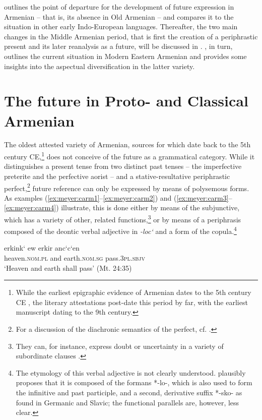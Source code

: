 \documentclass[output=paper,colorlinks,citecolor=brown]{langscibook}
\begin{document}
	 outlines the point of departure for the development of future expression in Armenian – that is, its absence in Old Armenian – and compares it to the situation in other early Indo-European languages. Thereafter, the two main changes in the Middle Armenian period, that is first the creation of a periphrastic present and its later reanalysis as a future, will be discussed in . , in turn, outlines the current situation in Modern Eastern Armenian and provides some insights into the aspectual diversification in the latter variety.
	
	
	\section{The future in Proto- and Classical Armenian}\label{sec:meyer:carm}
	The oldest attested variety of Armenian, sources for which date back to the 5th century CE,\footnote{While the earliest epigraphic evidence of Armenian dates to the 5th century CE \citep{Stone19901}, the literary attestations post-date this period by far, with the earliest manuscript dating to the 9th century.} does not conceive of the future as a grammatical category. While it distinguishes a present tense from two distinct past tenses – the imperfective preterite and the perfective aorist – and a stative-resultative periphrastic perfect,\footnote{For a discussion of the diachronic semantics of the perfect, cf. \citet{Meyer2024a}.} future reference can only be expressed by means of polysemous forms. As examples (\ref{ex:meyer:carm1}–\ref{ex:meyer:carm2}) and (\ref{ex:meyer:carm3}–\ref{ex:meyer:carm4}) illustrate, this is done either by means of the subjunctive, which has a variety of other, related functions,\footnote{They can, for instance, express doubt or uncertainty in a variety of subordinate clauses \citep[200, 205--207]{Jensen1959}.} or by means of a periphrasis composed of the deontic verbal adjective in \textit{-loc‘} and a form of the copula.\footnote{The etymology of this verbal adjective is not clearly understood. \citet[129]{Godel1975} plausibly proposes that it is composed of the formans *-lo-, which is also used to form the infinitive and past participle, and a second, derivative suffix *-sko- as found in Germanic and Slavic; the functional parallels are, however, less clear.}
	
	\ea \label{ex:meyer:carm1}
	\gll erkink‘ ew erkir anc‘c‘en\\
	heaven.\textsc{nom.pl} and earth.\textsc{nom.sg} pass.\textsc{3pl.sbjv}\\
	\glt ‘Heaven and earth shall pass’ (Mt. 24:35)
	\z {}
	
\end{document}
